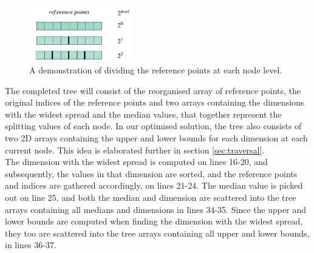 \begin{figure}[H]
\centering
\includegraphics[width=0.4\textwidth]{pics/plot-figs/divtree4.png}
\caption{A demonstration of dividing the reference points at each node level.}
\label{fig:divtree}
\end{figure}

The completed tree will consist of the reorganised array of reference points, the original indices of the reference points and two arrays containing the dimensions with the widest spread and the median values, that together represent the splitting values of each node. In our optimised solution, the tree also consists of two 2D arrays containing the upper and lower bounds for each dimension at each current node. This idea is elaborated further in section \ref{sec:traversal}. 
\\[2mm]
The dimension with the widest spread is computed on lines 16-20, and subsequently, the values in that dimension are sorted, and the reference points and indices are gathered accordingly, on lines 21-24. The median value is picked out on line 25, and both the median and dimension are scattered into the tree arrays containing all medians and dimensions in lines 34-35. Since the upper and lower bounds are computed when finding the dimension with the widest spread, they too are scattered into the tree arrays containing all upper and lower bounds, in lines 36-37. 


